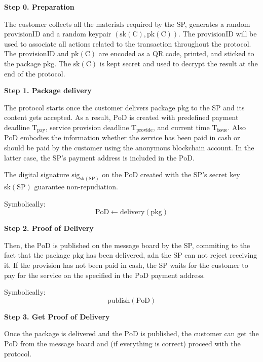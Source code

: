 \documentclass{ieeeaccess}
\begin{document}
\noindent \textbf
{Step 0.  Preparation}\label{step-0-preparation}

The customer collects all the $\mathrm{materials}$ required by the SP, generates a random $\mathrm{provisionID}$ and a random keypair $(\mathrm{sk(C)},\mathrm{pk(C)})$. The $\mathrm{provisionID}$ will be used to associate all actions related to the transaction throughout the protocol. The $\mathrm{provisionID}$ and $\mathrm{pk(C)}$ are encoded as a QR code, printed, and sticked to the package $\mathrm{pkg}$. The $\mathrm{sk(C)}$ is kept secret and used to decrypt the $\mathrm{result}$ at the end of the protocol.

\noindent \textbf
{Step 1. Package delivery}\label{step-1-package-delivery}

The protocol starts once the customer delivers package $\mathrm{pkg}$ to the SP and its content gets accepted. As a result, $\mathrm{PoD}$ is created with predefined payment deadline $\mathrm{T}_\mathrm{pay}$, service provision deadline $\mathrm{T}_\mathrm{provide}$, and current time $\mathrm{T}_\mathrm{issue}$. Also $\mathrm{PoD}$ embodies the information whether the service has been paid in cash or should be paid by the customer using the anonymous blockchain account. In the latter case, the SP's payment address is included in the $\mathrm{PoD}$.

The digital signature $\mathrm{sig}_{\mathrm{sk}(\mathrm{SP})}$ on the $\mathrm{PoD}$ created with the SP's secret key $\mathrm{sk}(\mathrm{SP})$ guarantee non-repudiation.

Symbolically: 
\[
\mathrm{PoD \gets delivery(pkg)}
\]

\noindent \textbf
{Step 2. Proof of Delivery}\label{step-2-pod}

Then, the $\mathrm{PoD}$ is published on the message board by the SP, commiting to the fact that the package $\mathrm{pkg}$ has been delivered, adn the SP can not reject receiving it. If the provision has not been paid in cash, the SP waits for the customer to pay for the service on the specified in the $\mathrm{PoD}$ payment $\mathrm{address}$.

Symbolically: 
\[
\mathrm{publish(PoD)}
\]

\noindent \textbf
{Step 3. Get Proof of Delivery}\label{step-3-get-pod}

Once the package is delivered and the $\mathrm{PoD}$ is published, the customer can get the $\mathrm{PoD}$ from the message board and (if everything is correct) proceed with the protocol.
\end{document}
